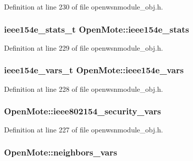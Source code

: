 Definition at line 230 of file openwsnmodule\+\_\+obj.\+h.

\subsubsection[{\texorpdfstring{ieee154e\+\_\+stats}{ieee154e_stats}}]{\setlength{\rightskip}{0pt plus 5cm}ieee154e\+\_\+stats\+\_\+t Open\+Mote\+::ieee154e\+\_\+stats}\hypertarget{struct_open_mote_aad80fcc3f8dc5dae8184c964a3ebcb77}{}\label{struct_open_mote_aad80fcc3f8dc5dae8184c964a3ebcb77}


Definition at line 229 of file openwsnmodule\+\_\+obj.\+h.

\subsubsection[{\texorpdfstring{ieee154e\+\_\+vars}{ieee154e_vars}}]{\setlength{\rightskip}{0pt plus 5cm}ieee154e\+\_\+vars\+\_\+t Open\+Mote\+::ieee154e\+\_\+vars}\hypertarget{struct_open_mote_ab16c29e7d0986128622698836ea1d01f}{}\label{struct_open_mote_ab16c29e7d0986128622698836ea1d01f}


Definition at line 228 of file openwsnmodule\+\_\+obj.\+h.

\subsubsection[{\texorpdfstring{ieee802154\+\_\+security\+\_\+vars}{ieee802154_security_vars}}]{ Open\+Mote\+::ieee802154\+\_\+security\+\_\+vars}\hypertarget{struct_open_mote_a2e1cf098b70a212c0137dcabf8a51326}{}\label{struct_open_mote_a2e1cf098b70a212c0137dcabf8a51326}


Definition at line 227 of file openwsnmodule\+\_\+obj.\+h.

\subsubsection[{\texorpdfstring{neighbors\+\_\+vars}{neighbors_vars}}]{ Open\+Mote\+::neighbors\+\_\+vars}\hypertarget{struct_open_mote_a6d24b1df68cebe6b4e30bf6606875e19}{}\label{struct_open_mote_a6d24b1df68cebe6b4e30bf6606875e19}


